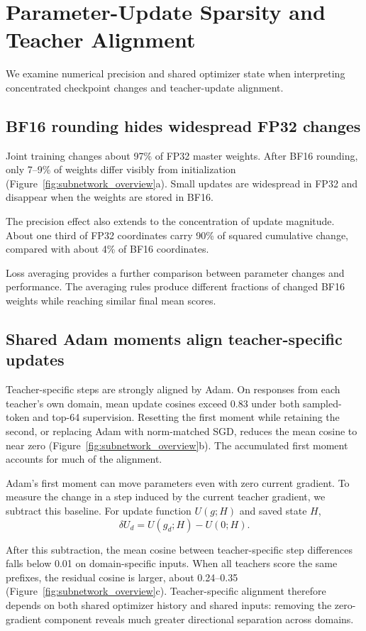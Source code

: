 \section{Parameter-Update Sparsity and Teacher Alignment}
\label{sec:subnetworks}

We examine numerical precision and shared optimizer state when interpreting concentrated checkpoint changes \citep{yu2026denseupdates} and teacher-update alignment.

\subsection{BF16 rounding hides widespread FP32 changes}

Joint training changes about 97\% of FP32 master weights. After BF16 rounding, only 7--9\% of weights differ visibly from initialization (Figure~\ref{fig:subnetwork_overview}a). Small updates are widespread in FP32 and disappear when the weights are stored in BF16.

The precision effect also extends to the concentration of update magnitude. About one third of FP32 coordinates carry 90\% of squared cumulative change, compared with about 4\% of BF16 coordinates.

Loss averaging provides a further comparison between parameter changes and performance. The averaging rules produce different fractions of changed BF16 weights while reaching similar final mean scores.



\subsection{Shared Adam moments align teacher-specific updates}

Teacher-specific steps are strongly aligned by Adam. On responses from each teacher's own domain, mean update cosines exceed 0.83 under both sampled-token and top-64 supervision. Resetting the first moment while retaining the second, or replacing Adam with norm-matched SGD, reduces the mean cosine to near zero (Figure~\ref{fig:subnetwork_overview}b). The accumulated first moment accounts for much of the alignment.

Adam's first moment can move parameters even with zero current gradient. To measure the change in a step induced by the current teacher gradient, we subtract this baseline. For update function $U(g;H)$ and saved state $H$,
\begin{equation}
\delta U_d=U(g_d;H)-U(0;H).
\label{eq:history_subtracted}
\end{equation}

After this subtraction, the mean cosine between teacher-specific step differences falls below 0.01 on domain-specific inputs. When all teachers score the same prefixes, the residual cosine is larger, about 0.24--0.35 (Figure~\ref{fig:subnetwork_overview}c). Teacher-specific alignment therefore depends on both shared optimizer history and shared inputs: removing the zero-gradient component reveals much greater directional separation across domains.
